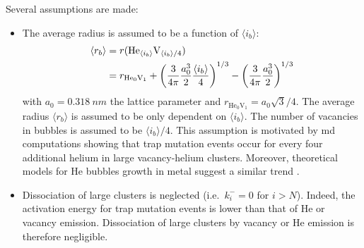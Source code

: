Several assumptions are made:
\begin{itemize}
    \item The average radius is assumed to be a function of $\langle i_b \rangle$:
    \begin{equation}
        \begin{split}
            \langle r_b \rangle &= r(\mathrm{He}_{\langle i_b \rangle}\mathrm{V}_{\langle i_b \rangle/4}) \\
            &= r_{\mathrm{He}_0 \mathrm{V}_1} + \left(\frac{3}{4 \pi} \frac{a_0^3}{2} \frac{\langle i_b \rangle}{4} \right)^{1/3} - \left(\frac{3}{4 \pi} \frac{a_0^3}{2} \right)^{1/3}
        \end{split}
        \labeq{radius average}
    \end{equation}
    with $a_0 = \SI{0.318}{nm}$ the lattice parameter and $r_{\mathrm{He}_0 \mathrm{V}_1} =  a_0 \sqrt{3}/4$.
    The average radius $\langle r_b \rangle$ is assumed to be only dependent on $\langle i_b \rangle$.
    The number of vacancies in bubbles is assumed to be $\langle i_b \rangle/4$.
    This assumption is motivated by \gls{md} computations showing that \gls{trap mutation} events occur for every four additional helium in large \gls{vacancy}-helium clusters.
    Moreover, theoretical models for He bubbles growth in metal suggest a similar trend .
    \item Dissociation of large clusters is neglected (i.e.\ $k_i^- = 0$ for $i>N$).
    Indeed, the activation energy for \gls{trap mutation} events is lower than that of He or \gls{vacancy} emission. Dissociation of large clusters by \gls{vacancy} or He emission is therefore negligible.
\end{itemize}

